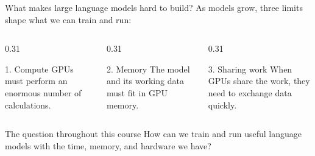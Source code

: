 \documentclass[handout]{beamer}
\begin{document}
\begin{frame}{What makes large language models hard to build?}
  As models grow, three limits shape what we can train and run:
  \begin{columns}[t]
    \begin{column}{0.31\linewidth}
      \begin{block}{1. Compute}
        \small
        GPUs must perform an enormous number of calculations.
      \end{block}
    \end{column}
    \begin{column}{0.31\linewidth}
      \begin{block}{2. Memory}
        \small
        The model and its working data must fit in GPU memory.
      \end{block}
    \end{column}
    \begin{column}{0.31\linewidth}
      \begin{block}{3. Sharing work}
        \small
        When GPUs share the work, they need to exchange data quickly.
      \end{block}
    \end{column}
  \end{columns}
  \vspace{4pt}
  \begin{alertblock}{The question throughout this course}
    How can we train and run useful language models with the time, memory, and hardware we have?
  \end{alertblock}
\end{frame}
\end{document}
